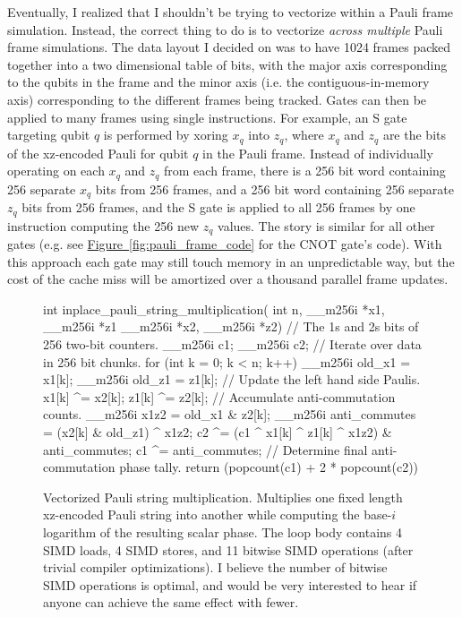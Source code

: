 \documentclass[onecolumn,unpublished]{quantumarticle}
\theoremstyle{definition}
\theoremstyle{definition}
\theoremstyle{definition}
\newcommand{\fig}[1]{\hyperref[fig:#1]{Figure~\ref*{fig:#1}}}
\begin{document}
Eventually, I realized that I shouldn't be trying to vectorize within a Pauli frame simulation.
Instead, the correct thing to do is to vectorize {\em across multiple} Pauli frame simulations.
The data layout I decided on was to have 1024 frames packed together into a two dimensional table of bits, with the major axis corresponding to the qubits in the frame and the minor axis (i.e. the contiguous-in-memory axis) corresponding to the different frames being tracked.
Gates can then be applied to many frames using single instructions.
For example, an S gate targeting qubit $q$ is performed by xoring $x_q$ into $z_q$, where $x_q$ and $z_q$ are the bits of the xz-encoded Pauli for qubit $q$ in the Pauli frame.
Instead of individually operating on each $x_q$ and $z_q$ from each frame, there is a 256 bit word containing 256 separate $x_q$ bits from 256 frames, and a 256 bit word containing 256 separate $z_q$ bits from 256 frames, and the S gate is applied to all 256 frames by one  instruction computing the 256 new $z_q$ values.
The story is similar for all other gates (e.g. see \fig{pauli_frame_code} for the CNOT gate's code).
With this approach each gate may still touch memory in an unpredictable way, but the cost of the cache miss will be amortized over a thousand parallel frame updates.

\begin{figure}
    \centering
\begin{cpp}
    int inplace_pauli_string_multiplication(
            int n, __m256i *x1, __m256i *z1 __m256i *x2, __m256i *z2) {
        // The 1s and 2s bits of 256 two-bit counters.
        __m256i c1{};
        __m256i c2{};
        // Iterate over data in 256 bit chunks.
        for (int k = 0; k < n; k++) {
            __m256i old_x1 = x1[k];
            __m256i old_z1 = z1[k];
            // Update the left hand side Paulis.
            x1[k] ^= x2[k];
            z1[k] ^= z2[k];
            // Accumulate anti-commutation counts.
            __m256i x1z2 = old_x1 & z2[k];
            __m256i anti_commutes = (x2[k] & old_z1) ^ x1z2;
            c2 ^= (c1 ^ x1[k] ^ z1[k] ^ x1z2) & anti_commutes;
            c1 ^= anti_commutes;
        }
        // Determine final anti-commutation phase tally.
        return (popcount(c1) + 2 * popcount(c2)) %
    }
\end{cpp}
    \caption{
        Vectorized Pauli string multiplication.
        Multiplies one fixed length xz-encoded Pauli string into another while computing the base-$i$ logarithm of the resulting scalar phase.
        The loop body contains 4 SIMD loads, 4 SIMD stores, and 11 bitwise SIMD operations (after trivial compiler optimizations).
        I believe the number of bitwise SIMD operations is optimal, and would be very interested to hear if anyone can achieve the same effect with fewer.
    }
    \label{fig:pauli_mult_code}
\end{figure}
\end{document}
